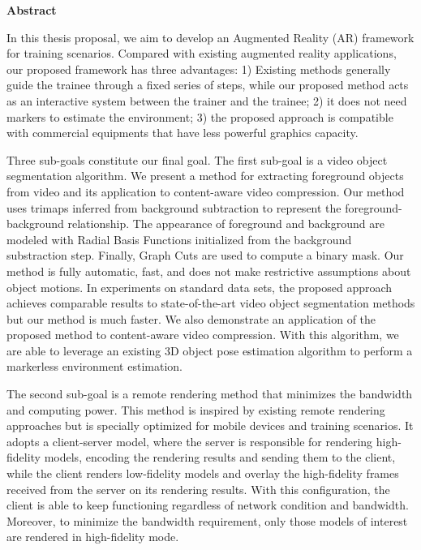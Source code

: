 
\begin{center}\textbf{Abstract}\end{center}

In this thesis proposal, we aim to develop an Augmented Reality (AR) framework for training scenarios.
Compared with existing augmented reality applications, our proposed framework has three advantages: 1) Existing methods generally guide the trainee through a fixed series of steps, while our proposed method acts as an interactive system between the trainer and the trainee; 2) it does not need markers to estimate the environment; 3) the proposed approach is compatible with commercial equipments that have less powerful graphics capacity.

Three sub-goals constitute our final goal.
The first sub-goal is a video object segmentation algorithm.
We present a method for extracting foreground objects from video and its application to content-aware video compression. Our method uses trimaps inferred from background subtraction to represent the foreground-background relationship. The appearance of foreground and background are modeled with Radial Basis Functions initialized from the background substraction step. Finally, Graph Cuts are used to compute a binary mask. Our method is fully automatic, fast, and does not make restrictive assumptions about object motions. In experiments on standard data sets, the proposed approach achieves comparable results to state-of-the-art video object segmentation methods but our method is much faster. We also demonstrate an application of the proposed method to content-aware video compression.
With this algorithm, we are able to leverage an existing 3D object pose estimation algorithm to perform a markerless environment estimation.

The second sub-goal is a remote rendering method that minimizes the bandwidth and computing power. This method is inspired by existing remote rendering approaches but is specially optimized for mobile devices and training scenarios.
It adopts a client-server model, where the server is responsible for rendering high-fidelity models, encoding the rendering results and sending them to the client, while the client renders low-fidelity models and overlay the high-fidelity frames received from the server on its rendering results.
With this configuration, the client is able to keep functioning regardless of network condition and bandwidth.
Moreover, to minimize the bandwidth requirement, only those models of interest are rendered in high-fidelity mode.

